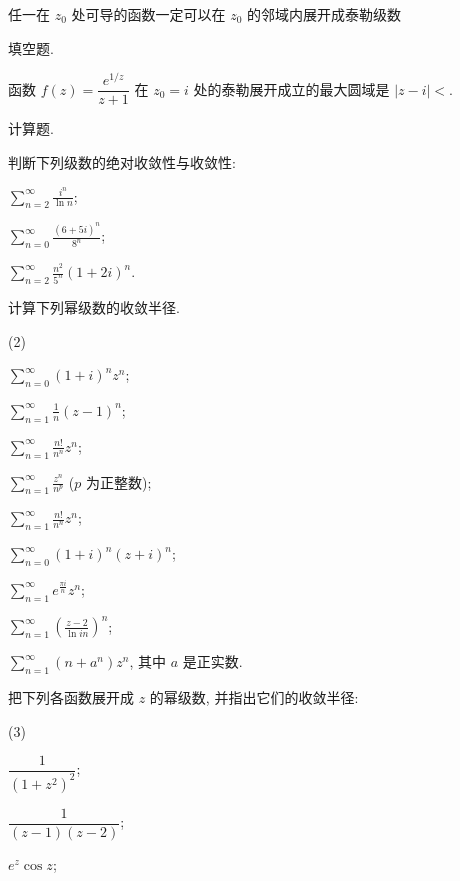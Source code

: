 \begin{homework}
\begin{subex}
\begin{exchoice}
			\item 任一在 $z_0$ 处可导的函数一定可以在 $z_0$ 的邻域内展开成泰勒级数
		\end{exchoice}
	\end{subex}
	\item 填空题.
	\begin{subex}
		\item 函数 $f(z)=\dfrac{e^{1/z}}{z+1}$ 在 $z_0=i$ 处的泰勒展开成立的最大圆域是 $|z-i|<$\fillblank{}.
	\end{subex}
	\item 计算题.
	\begin{subex}
		\item 判断下列级数的绝对收敛性与收敛性:
			\begin{subsubex}
				\item $\displaystyle\sum_{n=2}^\infty\frac{i^n}{\ln n}$;
				\item $\displaystyle\sum_{n=0}^\infty\frac{(6+5i)^n}{8^n}$;
				\item $\displaystyle\sum_{n=2}^\infty\frac{n^2}{5^n}(1+2i)^n$.
			\end{subsubex}
		\item 计算下列幂级数的收敛半径.
		\begin{subsubex}(2)
			\item $\displaystyle\sum_{n=0}^\infty(1+i)^nz^n$;
			\item $\displaystyle\sum_{n=1}^\infty\frac1n(z-1)^n$;
			\item $\displaystyle\sum_{n=1}^\infty\frac{n!}{n^n}z^n$;
			\item $\displaystyle\sum_{n=1}^\infty \frac{z^n}{n^p}$ ($p$ 为正整数);
			\item $\displaystyle\sum_{n=1}^\infty\frac{n!}{n^n}z^n$;
			\item $\displaystyle\sum_{n=0}^\infty (1+i)^n(z+i)^n$;
			\item $\displaystyle\sum_{n=1}^\infty e^{\frac{\pi i}n}z^n$;
			\item $\displaystyle\sum_{n=1}^\infty \left(\frac{z-2}{\ln{in}}\right)^n$;
			\item $\displaystyle\sum_{n=1}^\infty(n+a^n)z^n$, 其中 $a$ 是正实数.
		\end{subsubex}
		\item 把下列各函数展开成 $z$ 的幂级数, 并指出它们的收敛半径:
		\begin{subsubex}(3)
			\item $\dfrac1{(1+z^2)^2}$;
			\item $\dfrac{1}{(z-1)(z-2)}$;
			\item $e^z\cos z$;

\end{subsubex}
\end{subex}
\end{homework}

